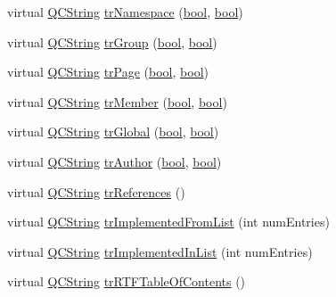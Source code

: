 \begin{DoxyCompactItemize}
virtual \hyperlink{class_q_c_string}{Q\+C\+String} \hyperlink{class_translator_japanese_a1112852197d7af74daae91dedd6a6d12}{tr\+Namespace} (\hyperlink{qglobal_8h_a1062901a7428fdd9c7f180f5e01ea056}{bool}, \hyperlink{qglobal_8h_a1062901a7428fdd9c7f180f5e01ea056}{bool})
\item 
virtual \hyperlink{class_q_c_string}{Q\+C\+String} \hyperlink{class_translator_japanese_a487dfcdae65de19b8d6f2b77e37b3bfd}{tr\+Group} (\hyperlink{qglobal_8h_a1062901a7428fdd9c7f180f5e01ea056}{bool}, \hyperlink{qglobal_8h_a1062901a7428fdd9c7f180f5e01ea056}{bool})
\item 
virtual \hyperlink{class_q_c_string}{Q\+C\+String} \hyperlink{class_translator_japanese_af028c18c284cd40c40a136efc53eab13}{tr\+Page} (\hyperlink{qglobal_8h_a1062901a7428fdd9c7f180f5e01ea056}{bool}, \hyperlink{qglobal_8h_a1062901a7428fdd9c7f180f5e01ea056}{bool})
\item 
virtual \hyperlink{class_q_c_string}{Q\+C\+String} \hyperlink{class_translator_japanese_a1ac54c351748990e35f5a3774e58216e}{tr\+Member} (\hyperlink{qglobal_8h_a1062901a7428fdd9c7f180f5e01ea056}{bool}, \hyperlink{qglobal_8h_a1062901a7428fdd9c7f180f5e01ea056}{bool})
\item 
virtual \hyperlink{class_q_c_string}{Q\+C\+String} \hyperlink{class_translator_japanese_af77cef2f7175f04e29588d2eedb4accd}{tr\+Global} (\hyperlink{qglobal_8h_a1062901a7428fdd9c7f180f5e01ea056}{bool}, \hyperlink{qglobal_8h_a1062901a7428fdd9c7f180f5e01ea056}{bool})
\item 
virtual \hyperlink{class_q_c_string}{Q\+C\+String} \hyperlink{class_translator_japanese_a1d20c21ed02a1ab2f4fb7b6db59a7e58}{tr\+Author} (\hyperlink{qglobal_8h_a1062901a7428fdd9c7f180f5e01ea056}{bool}, \hyperlink{qglobal_8h_a1062901a7428fdd9c7f180f5e01ea056}{bool})
\item 
virtual \hyperlink{class_q_c_string}{Q\+C\+String} \hyperlink{class_translator_japanese_aa830da2a5eeb6a506c907e597376af0c}{tr\+References} ()
\item 
virtual \hyperlink{class_q_c_string}{Q\+C\+String} \hyperlink{class_translator_japanese_ac2e4cbb4cdbf04f217211f6035e6f20a}{tr\+Implemented\+From\+List} (int num\+Entries)
\item 
virtual \hyperlink{class_q_c_string}{Q\+C\+String} \hyperlink{class_translator_japanese_ad9c3549fb27b3a61b1ab51f9d424beb3}{tr\+Implemented\+In\+List} (int num\+Entries)
\item 
virtual \hyperlink{class_q_c_string}{Q\+C\+String} \hyperlink{class_translator_japanese_a17418fd40efebdcce6a71679c57454f1}{tr\+R\+T\+F\+Table\+Of\+Contents} ()

\end{DoxyCompactItemize}
